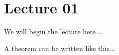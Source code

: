 \chapter{Lecture 01}

We will begin the lecture here...

\begin{Theorem}
	A theorem can be written like this...
\end{Theorem}
